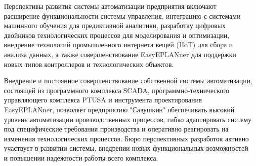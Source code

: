 {  \par \redline Перспективы развития системы автоматизации предприятия включают расширение функциональности системы управления, интеграцию с системами машинного обучения для предиктивной аналитики, разработку цифровых двойников технологических процессов для моделирования и оптимизации, внедрение технологий промышленного интернета вещей (IIoT) для сбора и анализа данных, а также совершенствование EasyEPLANner для поддержки новых типов контроллеров и технологических объектов.

  \par \redline Внедрение и постоянное совершенствование собственной системы автоматизации, состоящей из программного комплекса SCADA, программно-технического управляющего комплекса PTUSA и инструмента проектирования EasyEPLANner, позволяет предприятию "Савушкин" обеспечивать высокий уровень автоматизации производственных процессов, гибко адаптировать систему под специфические требования производства и оперативно реагировать на изменения технологических процессов. Бюро перспективных разработок активно участвует в развитии системы, внедрении новых функциональных возможностей и повышении надежности работы всего комплекса.

  \par
}
